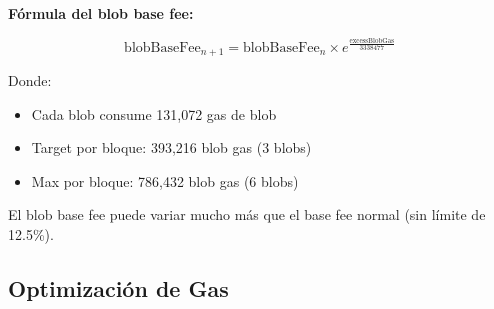 \documentclass[11pt,a4paper,twoside,openright]{book}
\theoremstyle{definition}
\theoremstyle{plain}
\theoremstyle{remark}
\begin{document}
\begin{mathnote}
\textbf{Fórmula del blob base fee:}

\[ \text{blobBaseFee}_{n+1} = \text{blobBaseFee}_n \times e^{\frac{\text{excessBlobGas}}{3338477}} \]

Donde:
\begin{itemize}
    \item Cada blob consume 131,072 gas de blob
    \item Target por bloque: 393,216 blob gas (3 blobs)
    \item Max por bloque: 786,432 blob gas (6 blobs)
\end{itemize}

El blob base fee puede variar mucho más que el base fee normal (sin límite de 12.5\%).
\end{mathnote}

\subsection{Optimización de Gas}
\end{document}
